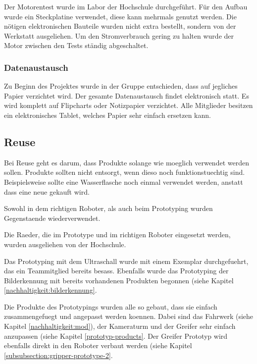 Der Motorentest wurde im Labor der Hochschule durchgeführt. Für den Aufbau wurde ein Steckplatine verwendet, diese kann mehrmals genutzt werden. Die nötigen elektronischen Bauteile wurden nicht extra bestellt, sondern von der Werkstatt ausgeliehen. Um den Stromverbrauch gering zu halten wurde der Motor zwischen den Tests ständig abgeschaltet. 

\subsubsection{Datenaustausch}

Zu Beginn des Projektes wurde in der Gruppe entschieden, dass auf jegliches Papier verzichtet wird. Der gesamte Datenaustausch findet elektronisch statt. Es wird komplett auf Flipcharts oder Notizpapier verzichtet. Alle Mitglieder besitzen ein elektronisches Tablet, welches Papier sehr einfach ersetzen kann.


\subsection{Reuse}

Bei Reuse geht es darum, dass Produkte solange wie moeglich verwendet werden sollen. Produkte sollten nicht entsorgt, wenn dieso noch funktionstuechtig sind. Beispielsweise sollte eine Wasserflasche noch einmal verwendet werden, anstatt dass eine neue gekauft wird.

Sowohl in dem richtigen Roboter, als auch beim Prototyping wurden Gegenstaende wiederverwendet.

Die Raeder, die im Prototype und im richtigen Roboter eingesetzt werden, wurden ausgeliehen von der Hochschule.

Das Prototyping mit dem Ultraschall wurde mit einem Exemplar durchgefuehrt, das ein Teammitglied bereits besass. Ebenfalls wurde das Prototyping der Bilderkennung mit bereits vorhandenen Produkten begonnen (siehe Kapitel \ref{nachhaltigkeit:bilderkennung}.

Die Produkte des Prototypings wurden alle so gebaut, dass sie einfach zusammengefuegt und angepasst werden koennen. Dabei sind das Fahrwerk (siehe Kapitel \ref{nachhaltigkeit:mod}), der Kameraturm und der Greifer sehr einfach anzupassen (siehe Kapitel \ref{prototyp-products}. Der Greifer Prototyp wird ebenfalls direkt in den Roboter verbaut werden (siehe Kapitel \ref{subsubsection:gripper-prototype-2}.


